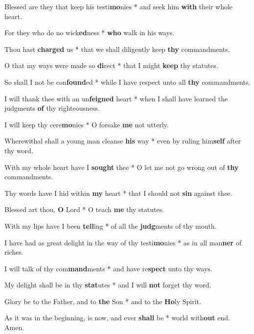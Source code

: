 \begin{multicols}{2}
	Blessed are they that keep his testi\textbf{mo}nies * and seek him \textbf{with} their whole heart.
	
	For they who do no wick\textbf{ed}ness * \textbf{who} walk in his ways.
	
	Thou hast \textbf{charged} us * that we shall diligently keep \textbf{thy} commandments.
	
	O that my ways were made so \textbf{di}rect * that I might \textbf{keep} thy statutes.
	
	So shall I not be con\textbf{found}ed * while I have respect unto all \textbf{thy} commandments.
	
	I will thank thee with an un\textbf{feigned} heart * when I shall have learned the judgments \textbf{of} thy righteousness.
	
	I will keep thy cere\textbf{mo}nies * O forsake \textbf{me} not utterly.
	
	Wherewithal shall a young man cleanse \textbf{his} way * even by ruling him\textbf{self} after thy word.
	
	With my whole heart have I \textbf{sought} thee * O let me not go wrong out of \textbf{thy} commandments.
	
	Thy words have I hid within \textbf{my} heart * that I should not \textbf{sin} against thee.
	
	Blessed art thou, \textbf{O} Lord * O teach \textbf{me} thy statutes.
	
	With my lips have I been \textbf{tell}ing * of all the \textbf{judg}ments of thy mouth.
	
	I have had as great delight in the way of thy testi\textbf{mo}nies * as in all man\textbf{ner} of riches.
	
	I will talk of thy com\textbf{mand}ments * and have re\textbf{spect} unto thy ways.
	
	My delight shall be in thy \textbf{stat}utes * and I will \textbf{not} forget thy word.
	
	Glory be to the Father, and to \textbf{the} Son * and to the \textbf{Ho}ly Spirit.
	
	As it was in the beginning, is now, and ever \textbf{shall} be * world with\textbf{out} end. Amen.
\end{multicols}
